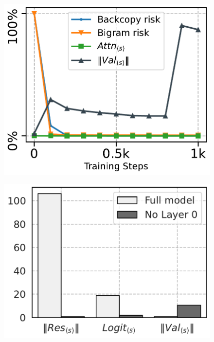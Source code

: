 \begin{figure}
  \centering
    \begin{minipage}{0.3\textwidth}
      \centering
      \label{fig:relu-attn}
      \includegraphics[width=\textwidth]{Figures/BBM/relu_dynamics.pdf}
  \end{minipage}
    \begin{minipage}{0.33\textwidth}
      \centering
      \label{fig:massive-interventions}
      \includegraphics[width=\textwidth]{Figures/BBM/massive_interventions.pdf}
  \end{minipage}

\end{figure}
